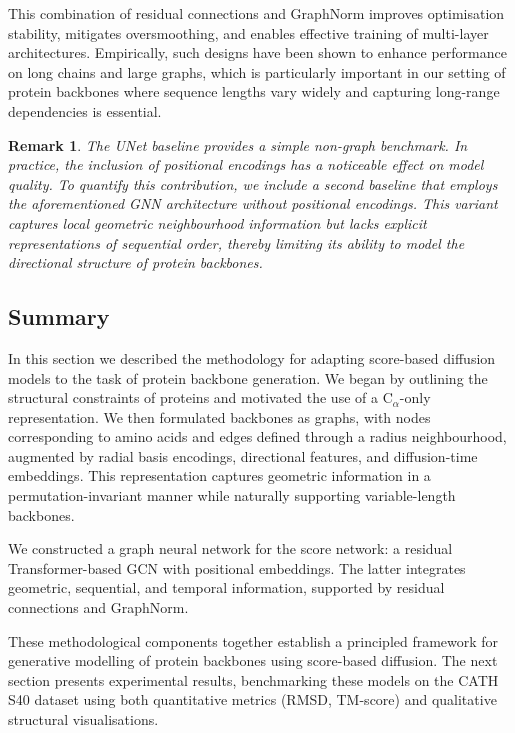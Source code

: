 \documentclass[a4paper,12pt]{article}
\newtheorem{remark}{Remark}[section]
\begin{document}
This combination of residual connections and GraphNorm improves optimisation stability, mitigates oversmoothing, and enables effective training of multi-layer architectures. Empirically, such designs have been shown to enhance performance on long chains and large graphs, which is particularly important in our setting of protein backbones where sequence lengths vary widely and capturing long-range dependencies is essential.
\begin{remark}
    The UNet baseline provides a simple non-graph benchmark. In practice, the inclusion of positional encodings has a noticeable effect on model quality. To quantify this contribution, we include a second baseline that employs the aforementioned GNN architecture without positional encodings. This variant captures local geometric neighbourhood information but lacks explicit representations of sequential order, thereby limiting its ability to model the directional structure of protein backbones.
\end{remark}

\subsection{Summary}\label{subsec:method-summary}
In this section we described the methodology for adapting score-based diffusion models to the task of protein backbone generation. We began by outlining the structural constraints of proteins and motivated the use of a C\(_\alpha\)-only representation. We then formulated backbones as graphs, with nodes corresponding to amino acids and edges defined through a radius neighbourhood, augmented by radial basis encodings, directional features, and diffusion-time embeddings. This representation captures geometric information in a permutation-invariant manner while naturally supporting variable-length backbones.

We constructed a graph neural network for the score network: a residual Transformer-based GCN with positional embeddings. The latter integrates geometric, sequential, and temporal information, supported by residual connections and GraphNorm.

These methodological components together establish a principled framework for generative modelling of protein backbones using score-based diffusion. The next section presents experimental results, benchmarking these models on the CATH S40 dataset using both quantitative metrics (RMSD, TM-score) and qualitative structural visualisations.
\end{document}
